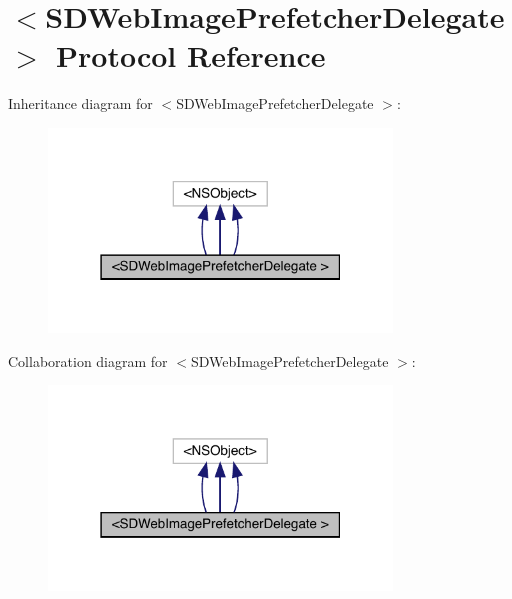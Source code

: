 \hypertarget{protocol_s_d_web_image_prefetcher_delegate_01-p}{}\section{$<$S\+D\+Web\+Image\+Prefetcher\+Delegate $>$ Protocol Reference}
\label{protocol_s_d_web_image_prefetcher_delegate_01-p}


Inheritance diagram for $<$S\+D\+Web\+Image\+Prefetcher\+Delegate $>$\+:\nopagebreak
\begin{figure}[H]
\begin{center}
\leavevmode
\includegraphics[width=259pt]{protocol_s_d_web_image_prefetcher_delegate_01-p__inherit__graph}
\end{center}
\end{figure}


Collaboration diagram for $<$S\+D\+Web\+Image\+Prefetcher\+Delegate $>$\+:\nopagebreak
\begin{figure}[H]
\begin{center}
\leavevmode
\includegraphics[width=259pt]{protocol_s_d_web_image_prefetcher_delegate_01-p__coll__graph}
\end{center}
\end{figure}
